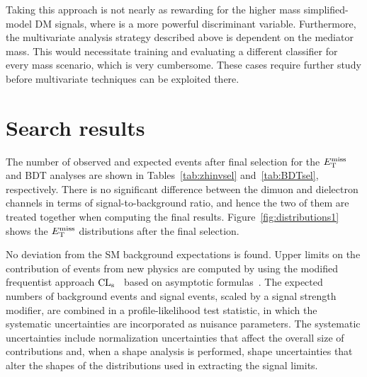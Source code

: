 Taking this approach is not nearly as rewarding for the higher mass simplified-model DM signals, where \met is a more powerful discriminant variable.
Furthermore, the multivariate analysis strategy described above is dependent on the mediator mass.
This would necessitate training and evaluating a different classifier for every mass scenario, which is very cumbersome.
These cases require further study before multivariate techniques can be exploited there.

\section{Search results}
\label{sec:dmresults}
The number of observed and expected events after final selection for the $E_\mathrm{T}^{\mathrm{miss}}$ and BDT analyses are shown in Tables~\ref{tab:zhinvsel} and~\ref{tab:BDTsel}, respectively. 
There is no significant difference between the dimuon and dielectron channels 
in terms of signal-to-background ratio, and hence the two of them 
are treated together when computing the final results. 
Figure~\ref{fig:distributions1} shows the $E_\mathrm{T}^{\mathrm{miss}}$
distributions after the final selection.

No deviation from the SM background expectations is found.
Upper limits on the contribution of events from new physics are
computed by using the modified frequentist approach
$\text{CL}_\text{s}$~\cite{Read1,junkcls} based on asymptotic
formulas~\cite{Cowan:2010js}. 
The expected numbers of background events and signal events, scaled by
a signal strength modifier, are combined in a profile-likelihood test 
statistic, in which the systematic uncertainties are incorporated as
nuisance parameters. 
The systematic uncertainties include normalization uncertainties that
affect the overall size of contributions and, when a shape analysis is
performed, shape uncertainties that alter the shapes of the
distributions used in extracting the signal limits. 


